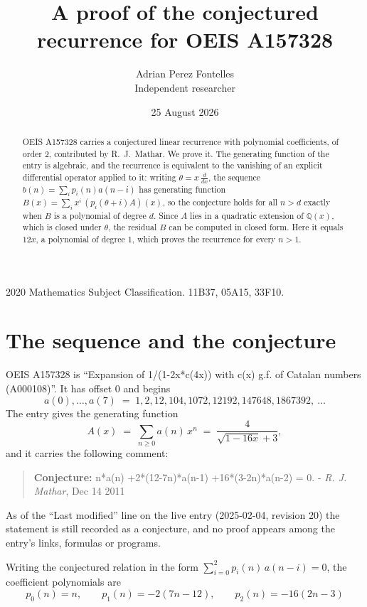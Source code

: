 \documentclass[11pt,a4paper]{article}
\title{A proof of the conjectured recurrence for OEIS A157328}
\author{Adrian Perez Fontelles\\ \small Independent researcher}
\date{25 August 2026}
\theoremstyle{plain}
\theoremstyle{definition}
\begin{document}
\maketitle

\begin{abstract}
OEIS A157328 carries a conjectured linear recurrence with polynomial coefficients, of
order 2, contributed by R.~J.~Mathar. We prove it. The generating function of the
entry is algebraic, and the recurrence is equivalent to the vanishing of an explicit
differential operator applied to it: writing $\theta=x\,\frac{d}{dx}$, the sequence
$b(n)=\sum_{i}p_{i}(n)a(n-i)$ has generating function
$B(x)=\sum_{i}x^{i}\,(p_{i}(\theta+i)A)(x)$, so the conjecture holds for all $n>d$ exactly
when $B$ is a polynomial of degree $d$. Since $A$ lies in a quadratic extension of
$\mathbb{Q}(x)$, which is closed under $\theta$, the residual $B$ can be computed in
closed form. Here it equals $12 x$, a polynomial of degree $1$, which proves
the recurrence for every $n>1$.
\end{abstract}

\noindent\small 2020 Mathematics Subject Classification. 11B37, 05A15, 33F10.\normalsize

\section{The sequence and the conjecture}

OEIS A157328 is ``Expansion of 1/(1-2x*c(4x)) with c(x) g.f. of Catalan numbers (A000108)''. It has offset $0$ and begins
\[
a(0),\dots,a(7)\;=\;1, 2, 12, 104, 1072, 12192, 147648, 1867392,\ \dots
\]
The entry gives the generating function
\begin{equation}\label{eq:gf}
A(x)\;=\;\sum_{n\ge 0} a(n)\,x^{n}\;=\;\frac{4}{\sqrt{1 - 16 x} + 3} ,
\end{equation}
and it carries the following comment:
\begin{quote}\small
\textbf{Conjecture:} n*a(n) +2*(12-7n)*a(n-1) +16*(3-2n)*a(n-2) = 0. - \emph{R. J. Mathar}, Dec 14 2011
\end{quote}
As of the ``Last modified'' line on the live entry (2025-02-04, revision 20) the
statement is still recorded as a conjecture, and no proof appears among the entry's links,
formulas or programs.

Writing the conjectured relation in the form $\sum_{i=0}^{2}p_{i}(n)\,a(n-i)=0$,
the coefficient polynomials are
\[
p_{0}(n)=n,\qquad p_{1}(n)=- 2 \left(7 n - 12\right),\qquad p_{2}(n)=- 16 \left(2 n - 3\right)
\]
\end{document}
